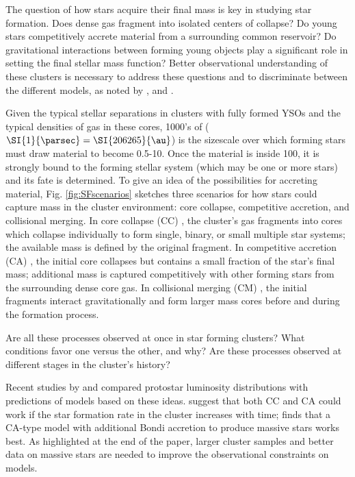 The question of how stars acquire their final mass is key in studying star formation. Does dense gas fragment into isolated centers of collapse? Do young stars competitively accrete material from a surrounding common reservoir? Do gravitational interactions between forming young objects play a significant role in setting the final stellar mass function? Better observational understanding of these clusters is necessary to address these questions and to discriminate between the different models, as noted by \citet{Bonnell:2006ee}, \citet{Offner:2011ex} and \citet{Myers:2011fy}.

Given the typical stellar separations in clusters with fully formed YSOs and the typical densities of gas in these cores, \num{1000}'s of \si{\au} ($\SI{1}{\parsec} = \SI{206265}{\au} $) is the sizescale over which forming stars must draw material to become 0.5-\SI{10}{\Msun}. Once the material is inside \SI{100}{\au}, it is strongly bound to the forming stellar system (which may be one or more stars) and its fate is determined. To give an idea of the possibilities for accreting material, Fig. \ref{fig:SFscenarios} sketches three scenarios for how stars could capture mass in the cluster environment: core collapse, competitive accretion, and collisional merging. In core collapse (CC) \citep[Fig.~\ref{subfig:scenarios:a},][]{McKee:2003gxa, Myers:2011fy}, the cluster's gas fragments into cores which collapse individually to form single, binary, or small multiple star systems; the available mass is defined by the original fragment. In competitive accretion (CA) \citep[Fig.~\ref{subfig:scenarios:b},][]{Bonnell:1997vta}, the initial core collapses but contains a small fraction of the star's final mass; additional mass is captured competitively with other forming stars from the surrounding dense core gas. In collisional merging (CM) \citep[Fig.~\ref{subfig:scenarios:c},][]{Bonnell:2002et}, the initial fragments interact gravitationally and form larger mass cores before and during the formation process. 

Are all these processes observed at once in star forming clusters? What conditions favor one versus the other, and why? Are these processes observed at different stages in the cluster's history?

Recent studies by \citet{Offner:2011ex} and \citet{Myers:2011fy} compared protostar luminosity distributions with predictions of models based on these ideas. \citet{Offner:2011ex} suggest that both CC and CA could work if the star formation rate in the cluster increases with time; \citep{Myers:2011fy} finds that a CA-type model with additional Bondi accretion to produce massive stars works best. As highlighted at the end of the \citet{Offner:2011ex} paper, larger cluster samples and better data on massive stars are needed to improve the observational constraints on models.


